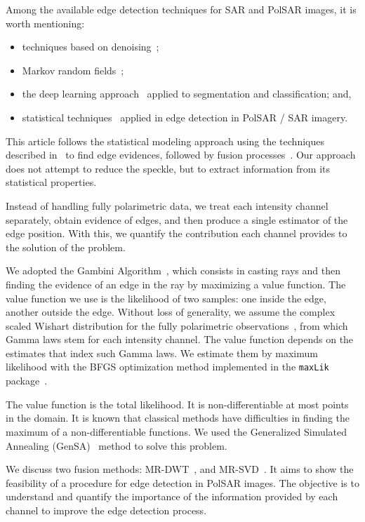 \documentclass[journal]{IEEEtran}
\begin{document}
Among the available edge detection techniques for SAR and PolSAR images, it is worth mentioning:
\begin{itemize}
\item techniques based on denoising~\cite{sjx, lzly, wxbzw, law, cgaf};   
\item Markov random fields~\cite{bf};	
\item the deep learning approach~\cite{bac, ztmxzxf} applied to segmentation and classification; and,
\item statistical techniques~\cite{gmbf, fbgm, nhfc} applied in edge detection in PolSAR / SAR imagery.
\end{itemize}

This article follows the statistical modeling approach using the techniques described in~\cite{gmbf, fbgm, nhfc} to find edge evidences, followed by fusion processes~\cite{mit, bmf_2019}. 
Our approach does not attempt to reduce the speckle, but to extract information from its statistical properties.

Instead of handling fully polarimetric data, we treat each intensity channel separately, obtain evidence of edges, and then produce a single estimator of the edge position.
With this, we quantify the contribution each channel provides to the solution of the problem.

We adopted the Gambini Algorithm~\cite{gmbf_sc}, which consists in casting rays and then finding the evidence of an edge in the ray by maximizing a value function.
The value function we use is the likelihood of two samples: one inside the edge, another outside the edge.
Without loss of generality, we assume the complex scaled Wishart distribution for the fully polarimetric observations~\cite{ade}, from which Gamma laws stem for each intensity channel.
The value function depends on the estimates that index such Gamma laws.
We estimate them by maximum likelihood with the BFGS optimization method implemented in the \texttt{maxLik} package~\cite{ht}.

The value function is the total likelihood.
It is non-differentiable at most points in the domain. 
It is known that classical methods have difficulties in finding the maximum of a non-differentiable functions. 
We used the Generalized Simulated Annealing (GenSA)~\cite{xgsh} method to solve this problem. 

We discuss two fusion methods: 
MR-DWT~\cite{n_r}, and 
MR-SVD~\cite{naidu}. 
It aims to show the feasibility of a procedure for edge detection in PolSAR images. 
The objective is to understand and quantify the importance of the information provided by each channel to improve the edge detection process.
\end{document}
